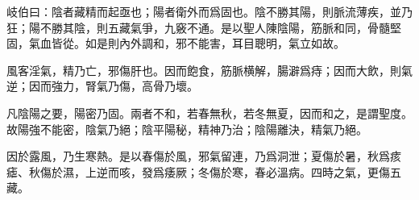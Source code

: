 \documentclass[draft,12pt]{ctexbook}
\begin{document}

\begin{yuanwen}
岐伯曰：陰者藏精而起亟也；陽者衛外而爲固也。陰不勝其陽，則脈流薄疾，並乃狂；陽不勝其陰，則五藏氣爭，九竅不通。是以聖人陳陰陽，筋脈和同，骨髓堅固，氣血皆從。如是則內外調和，邪不能害，耳目聰明，氣立如故。

風客淫氣，精乃亡，邪傷肝也。因而飽食，筋脈横解，腸澼爲痔；因而大飲，則氣逆；因而強力，腎氣乃傷，高骨乃壞。

凡陰陽之要，陽密乃固。兩者不和，若春無秋，若冬無夏，因而和之，是謂聖度。故陽強不能密，陰氣乃絕；陰平陽秘，精神乃治；陰陽離決，精氣乃絕。

因於露風，乃生寒熱。是以春傷於風，邪氣留連，乃爲洞泄；夏傷於暑，秋爲痎瘧、秋傷於濕，上逆而咳，發爲痿厥；冬傷於寒，春必溫病。四時之氣，更傷五藏。
\end{yuanwen}

\end{document}
